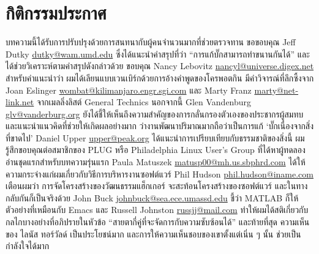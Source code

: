 \chapter{กิติกรรมประกาศ}

บทความนี้ได้รับการปรับปรุงด้วยการสนทนากับผู้คนจำนวนมากที่ช่วยตรวจทาน
ขอขอบคุณ Jeff Dutky \href{mailto:dutky@wam.umd.edu}{dutky@wam.umd.edu}
ซึ่งได้แนะนำคำสรุปที่ว่า ``การแก้บั๊กสามารถทำขนานกันได้''
และได้ช่วยวิเคราะห์ตามคำสรุปดังกล่าวด้วย ขอบคุณ Nancy Lebovitz \href{mailto:nancyl@universe.digex.net}{nancyl@universe.digex.net}
สำหรับคำแนะนำว่า ผมได้เลียนแบบเวนเบิร์กด้วยการอ้างคำพูดของโครพอตกิน
มีคำวิจารณ์ที่ลึกซึ้งจาก Joan Eslinger
\href{mailto:wombat@kilimanjaro.engr.sgi.com}{wombat@{\wbr}kilimanjaro.engr.sgi.com}  และ
Marty Franz \href{mailto:marty@net-link.net}{marty@net-link.net}
จากเมลลิ่งลิสต์ General Technics นอกจากนี้ Glen Vandenburg \href{mailto:glv@vanderburg.org}{glv@vanderburg.org}
ยังได้ชี้ให้เห็นถึงความสำคัญของการกลั่นกรองตัวเองของประชากรผู้สมทบ
และแนะนำแนวคิดที่ช่วยให้เกิดผลอย่างมาก
ว่างานพัฒนาปริมาณมากถือว่าเป็นการแก้ `บั๊กเนื่องจากสิ่งที่ขาดไป' Daniel
Upper \href{mailto:upper@peak.org}{upper@peak.org}
ได้แนะนำการเปรียบเทียบกับธรรมชาติของสิ่งนี้ ผมรู้สึกขอบคุณต่อสมาชิกของ
PLUG หรือ Philadelphia Linux User's Group
ที่ได้หาผู้ทดลองอ่านชุดแรกสำหรับบทความรุ่นแรก Paula Matuszek
\href{mailto:matusp00@mh.us.sbphrd.com}{matusp00@mh.us.{\wbr}sbphrd.com}
ได้ให้ความกระจ่างแก่ผมเกี่ยวกับวิธีการบริหารงานซอฟต์แวร์ Phil Hudson
\href{mailto:phil.hudson@iname.com}{phil.hudson@iname.com} เตือนผมว่า
การจัดโครงสร้างของวัฒนธรรมแฮ็กเกอร์ จะสะท้อนโครงสร้างของซอฟต์แวร์
และในทางกลับกันก็เป็นจริงด้วย John Buck
\href{mailto:johnbuck@sea.ece.umassd.edu}{johnbuck{\wbr}@sea.ece.umassd.edu}  ชี้ว่า
MATLAB ก็ให้ตัวอย่างที่เหมือนกับ Emacs และ Russell Johnston
\href{mailto:russjj@mail.com}{russjj@mail.com}
ทำให้ผมได้สติเกี่ยวกับกลไกบางอย่างที่อภิปรายในหัวข้อ
``สายตากี่คู่ที่จะจัดการกับความซับซ้อนได้'' และท้ายที่สุด ความเห็นของ
ไลนัส ทอร์วัลด์ เป็นประโยชน์มาก และการให้ความเห็นชอบของเขาตั้งแต่เนิ่น ๆ
นั้น ช่วยเป็นกำลังใจได้มาก